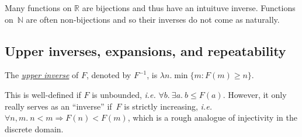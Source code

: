 Many functions on $\mathbb{R}$ are bijections and thus have an intuituve inverse.
Functions on~$\mathbb{N}$ are often non-bijections and so their inverses
do not come as naturally.

\subsection{Upper inverses, expansions, and repeatability}
\begin{defn} \label{defn: inverse}
	The \href{https://github.com/inv-ack/inv-ack/blob/7270e64a2600b771f2b1b1b151f7d13fb2ae6c97/inverse.v#L28-L45}{\color{blue}
		\emph{upper inverse}} of $F$, denoted by $F^{-1}$,
	is $\lambda n. \min\{m : F(m)\ge n\}$.
\end{defn}
\noindent This is well-defined if $F$ is unbounded,
\emph{i.e.} $\forall b.~\exists a.~b \leq F(a)$.
However, it only really serves as an ``inverse'' if~$F$ is strictly
increasing, \emph{i.e.} $\forall n,m.~n<m \Rightarrow F(n)<F(m)$, which is
a rough analogue of injectivity in the discrete domain.


